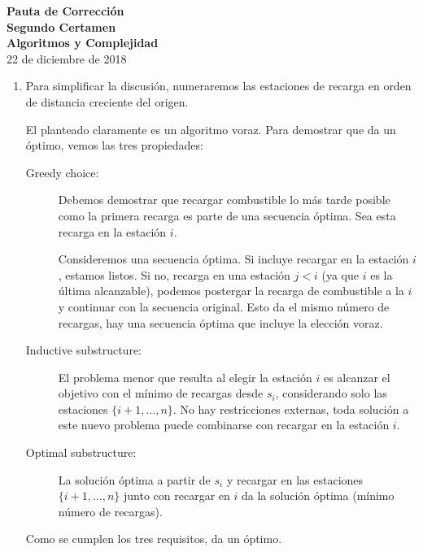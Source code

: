 \documentclass[english, spanish, fleqn]{article}
\begin{document}
\thispagestyle{empty}
  \begin{center}
    {\huge\textbf{Pauta de Corrección\\[0.4\baselineskip]
		  Segundo Certamen\\[0.25\baselineskip]
		  Algoritmos y Complejidad}}\\
    \vspace{0.5\baselineskip}
    {\large 22 de diciembre de 2018}
  \end{center}
  \vspace{5mm}

  \begin{enumerate}
  \item %
    Para simplificar la discusión,
    numeraremos las estaciones de recarga
    en orden de distancia creciente del origen.

    El planteado claramente es un algoritmo voraz.
    Para demostrar que da un óptimo,
    vemos las tres propiedades:
    \begin{description}
    \item[Greedy choice:]
      Debemos demostrar que recargar combustible lo más tarde posible
      como la primera recarga es parte de una secuencia óptima.
      Sea esta recarga en la estación \(i\).

      Consideremos una secuencia óptima.
      Si incluye recargar en la estación \(i\),
      estamos listos.
      Si no,
      recarga en una estación \(j < i\)
      (ya que \(i\) es la última alcanzable),
      podemos postergar la recarga de combustible a la \(i\)
      y continuar con la secuencia original.
      Esto da el mismo número de recargas,
      hay una secuencia óptima que incluye la elección voraz.
    \item[Inductive substructure:]
      El problema menor que resulta al elegir la estación \(i\)
      es alcanzar el objetivo con el mínimo de recargas desde \(s_i\),
      considerando solo las estaciones \(\{i + 1, \dotsc, n\}\).
      No hay restricciones externas,
      toda solución a este nuevo problema
      puede combinarse con recargar en la estación \(i\).
    \item[Optimal substructure:]
      La solución óptima a partir de \(s_i\)
      y recargar en las estaciones \(\{i + 1, \dotsc, n\}\)
      junto con recargar en \(i\) da la solución óptima
      (mínimo número de recargas).
    \end{description}
    Como se cumplen los tres requisitos,
    da un óptimo.


\end{enumerate}
\end{document}
